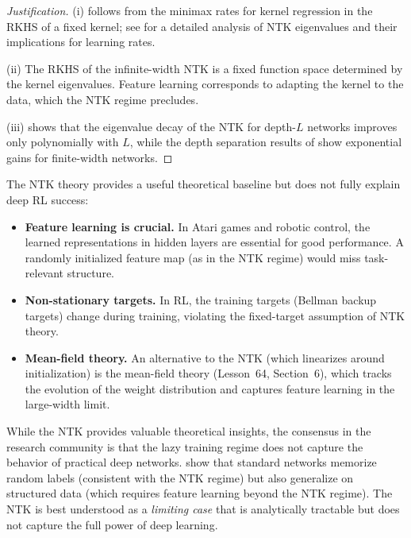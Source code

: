 \documentclass[11pt,a4paper]{article}
\begin{document}
\begin{proof}[Justification]
(i) follows from the minimax rates for kernel regression in the RKHS
of a fixed kernel; see \citet{bietti2019} for a detailed analysis of
NTK eigenvalues and their implications for learning rates.

(ii) The RKHS of the infinite-width NTK is a fixed function space
determined by the kernel eigenvalues.  Feature learning corresponds
to adapting the kernel to the data, which the NTK regime precludes.

(iii) \citet{bietti2019} shows that the eigenvalue decay of the
NTK for depth-$L$ networks improves only polynomially with $L$,
while the depth separation results of \citet{telgarsky2016} show
exponential gains for finite-width networks.
\end{proof}

\begin{rlconnection}[title={Beyond the NTK in Deep RL}]
The NTK theory provides a useful theoretical baseline but does not
fully explain deep RL success:
\begin{itemize}[nosep]
  \item \textbf{Feature learning is crucial.}  In Atari games and
    robotic control, the learned representations in hidden layers
    are essential for good performance.  A randomly initialized
    feature map (as in the NTK regime) would miss task-relevant
    structure.
  \item \textbf{Non-stationary targets.}  In RL, the training targets
    (Bellman backup targets) change during training, violating the
    fixed-target assumption of NTK theory.
  \item \textbf{Mean-field theory.}  An alternative to the NTK
    (which linearizes around initialization) is the mean-field theory
    (Lesson~64, Section~6), which tracks the evolution of the
    weight distribution and captures feature learning in the
    large-width limit.
\end{itemize}
\end{rlconnection}

\begin{warning}[title={NTK Does Not Explain Deep Learning}]
While the NTK provides valuable theoretical insights, the consensus
in the research community is that the lazy training regime does not
capture the behavior of practical deep networks.  \citet{zhang2021}
show that standard networks memorize random labels (consistent with
the NTK regime) but also generalize on structured data (which
requires feature learning beyond the NTK regime).  The NTK is best
understood as a \emph{limiting case} that is analytically tractable
but does not capture the full power of deep learning.
\end{warning}
\end{document}
